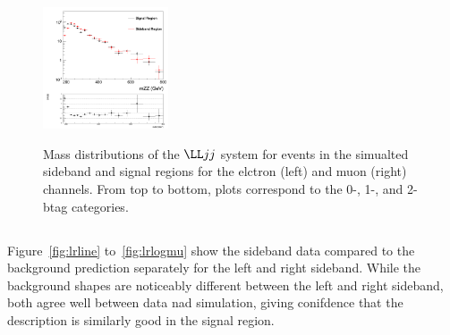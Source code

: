 \begin{figure}[htb]
{\includegraphics[width=0.33\textwidth]{plots/approvalxchecks/mZZ_SRvsSB_lep1_2btags_Log.png}
}
\caption{Mass distributions of the $\LL jj$ system for events in the simualted sideband and signal regions for the elctron (left)
 and muon (right) channels. From top to bottom, plots
correspond to the 0-, 1-, and 2-btag categories. 
\label{fig:clos}
}
\end{figure}


\subsection{}
Figure~\ref{fig:lrline} to~\ref{fig:lrlogmu} show the sideband data compared to the background prediction separately for the left and right sideband. While the background shapes are noticeably different between the left and right sideband, both agree well between data nad simulation, giving conifdence that the description is similarly good in the signal region. 


